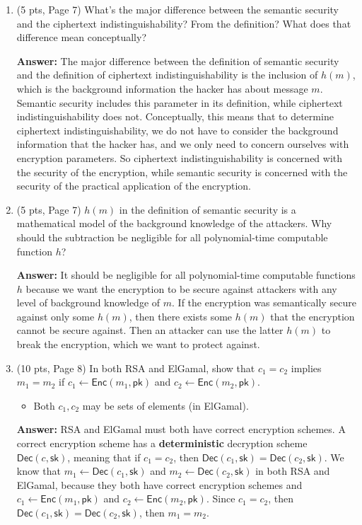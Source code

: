 \documentclass[10pt]{article}
\newcommand{\enc}{\mathsf{Enc}}
\newcommand{\dec}{\mathsf{Dec}}
\newcommand{\pk}{\mathsf{pk}}
\newcommand{\sk}{\mathsf{sk}}
\begin{document}
\begin{enumerate}
	\item (5 pts, Page 7)  What's the major difference between the semantic security and the ciphertext indistinguishability? From the definition? What does that difference mean conceptually?
	
	\textbf{Answer:} \newline The major difference between the definition of semantic security and the definition of ciphertext indistinguishability is the inclusion of $h(m)$, which is the background information the hacker has about message $m$. Semantic security includes this parameter in its definition, while ciphertext indistinguishability does not. Conceptually, this means that to determine ciphertext indistinguishability, we do not have to consider the background information that the hacker has, and we only need to concern ourselves with encryption parameters. So ciphertext indistinguishability is concerned with the security of the encryption, while semantic security is concerned with the security of the practical application of the encryption.
	
	\bigskip\item (5 pts, Page 7) $h(m)$ in the definition of semantic security is a mathematical model of the background knowledge of the attackers. Why should the subtraction be negligible for all polynomial-time computable function $h$? 
	
	\textbf{Answer:} \newline It should be negligible for all polynomial-time computable functions $h$ because we want the encryption to be secure against attackers with any level of background knowledge of $m$. If the encryption was semantically secure against only some $h(m)$, then there exists some $h(m)$ that the encryption cannot be secure against. Then an attacker can use the latter $h(m)$ to break the encryption, which we want to protect against.
	
	\bigskip\item (10 pts, Page 8) In both RSA and ElGamal, show that $c_1=c_2$ implies $m_1=m_2$ if $c_1\leftarrow \enc(m_1,\pk)$ and $c_2\leftarrow \enc(m_2,\pk)$.
	\begin{itemize}
		\item Both $c_1,c_2$ may be sets of elements (in ElGamal).
	\end{itemize}
	
	\textbf{Answer:} \newline RSA and ElGamal must both have correct encryption schemes. A correct encryption scheme has a \textbf{deterministic} decryption scheme $\dec(c, \sk)$, meaning that if $c_1=c_2$, then $\dec(c_1, \sk) = \dec(c_2, \sk)$. We know that $m_1\leftarrow \dec(c_1,\sk)$ and $m_2\leftarrow \dec(c_2,\sk)$ in both RSA and ElGamal, because they both have correct encryption schemes and $c_1\leftarrow \enc(m_1,\pk)$ and $c_2\leftarrow \enc(m_2,\pk)$. Since $c_1 = c_2$, then $\dec(c_1,\sk) = \dec(c_2,\sk)$, then $m_1=m_2$. 
	

\end{enumerate}
\end{document}
